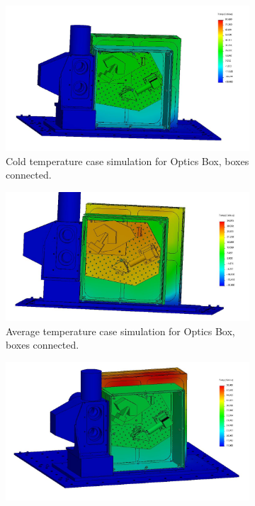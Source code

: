 \begin{figure}
    \centering
    \begin{subfigure}[h]{0.65\textwidth}
        \centering
        \includegraphics[width=\textwidth]{chap3_images/LIFE_V4_images/TA_Full_Model_Iter_1.JPG}
        \caption{Cold temperature case simulation for Optics Box, boxes connected.}
        \label{fig:LIFE_V4_TA_Optics_1a}
    \end{subfigure}
    \begin{subfigure}[h]{0.65\textwidth}
        \centering
        \includegraphics[width=\textwidth]{chap3_images/LIFE_V4_images/TA_Full_Model_Iter_2.JPG}
        \caption{Average temperature case simulation for Optics Box, boxes connected.}
        \label{fig:LIFE_V4_TA_Optics_1b}
    \end{subfigure}
    \begin{subfigure}[h]{0.65\textwidth}
        \centering
        \includegraphics[width=\textwidth]{chap3_images/LIFE_V4_images/TA_Full_Model_Iter_3.JPG}

\end{subfigure}
\end{figure}
